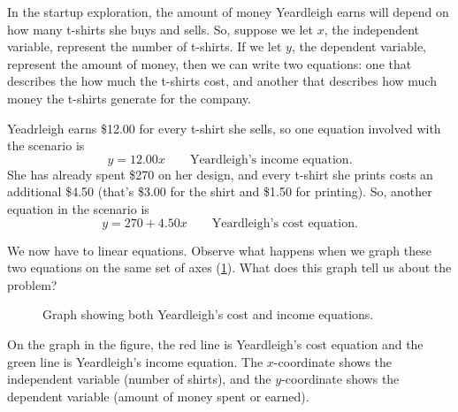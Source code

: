 In the startup exploration, the amount of money Yeardleigh earns will depend on how many t-shirts she buys and sells. So, suppose we let $x$, the independent variable, represent the number of t-shirts. If we let $y$, the dependent variable, represent the amount of money, then we can write two equations: one that describes the how much the t-shirts cost, and another that describes how much money the t-shirts generate for the company.

Yeadrleigh earns \$12.00 for every t-shirt she sells, so one equation involved with the scenario is \[y = 12.00x \qquad\text{Yeardleigh's income equation}.\] She has already spent \$270 on her design, and every t-shirt she prints costs an additional \$4.50 (that's \$3.00 for the shirt and \$1.50 for printing). So, another equation in the scenario is \[y = 270 + 4.50x\qquad\text{Yeardleigh's cost equation}.\]

We now have to linear equations. Observe what happens when we graph these two equations on the same set of axes (\cref{fig:tshirts}). What does this graph tell us about the problem?

\begin{figure}[!htbp]
\centering
{}
\caption{Graph showing both Yeardleigh's cost and income equations.}
\label{fig:tshirts}
\end{figure}

On the graph in the figure, the red line is Yeardleigh's cost equation and the green line is Yeardleigh's income equation. The $x$-coordinate shows the independent variable (number of shirts), and the $y$-coordinate shows the dependent variable (amount of money spent or earned).

